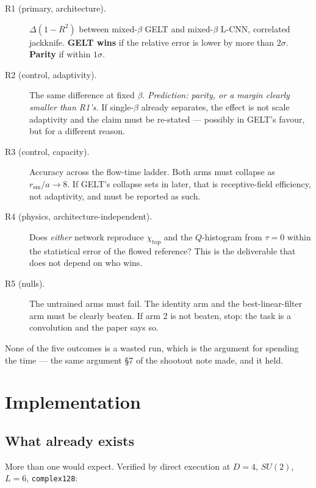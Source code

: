 \documentclass[11pt,a4paper]{article}
\begin{document}
\begin{description}
\item[R1 (primary, architecture).] $\Delta(1-R^2)$ between mixed-$\beta$ GELT and
  mixed-$\beta$ L-CNN, correlated jackknife. \textbf{GELT wins} if the relative
  error is lower by more than $2\sigma$. \textbf{Parity} if within $1\sigma$.
\item[R2 (control, adaptivity).] The same difference at fixed $\beta$.
  \emph{Prediction: parity, or a margin clearly smaller than R1's.} If single-$\beta$
  already separates, the effect is not scale adaptivity and the claim must be
  re-stated --- possibly in GELT's favour, but for a different reason.
\item[R3 (control, capacity).] Accuracy across the flow-time ladder. Both arms
  must collapse as $r_{\mathrm{sm}}/a \to 8$. If GELT's collapse sets in later,
  that is receptive-field efficiency, not adaptivity, and must be reported as
  such.
\item[R4 (physics, architecture-independent).] Does \emph{either} network
  reproduce $\chi_{\mathrm{top}}$ and the $Q$-histogram from $\tau = 0$ within the
  statistical error of the flowed reference? This is the deliverable that does
  not depend on who wins.
\item[R5 (nulls).] The untrained arms must fail. The identity arm and the
  best-linear-filter arm must be clearly beaten. If arm 2 is not beaten, stop:
  the task is a convolution and the paper says so.
\end{description}

None of the five outcomes is a wasted run, which is the argument for spending the
time --- the same argument \S7 of the shootout note made, and it held.

\section{Implementation}

\subsection{What already exists}

More than one would expect. Verified by direct execution at $D = 4$, $SU(2)$,
$L = 6$, \texttt{complex128}:
\end{document}
